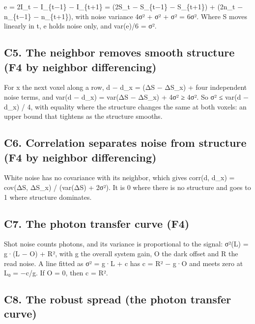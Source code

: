 e = 2I\_\allowbreak{}t − I\_\allowbreak{}\{t−1\} − I\_\allowbreak{}\{t+1\} = (2S\_\allowbreak{}t − S\_\allowbreak{}\{t−1\} − S\_\allowbreak{}\{t+1\}) + (2n\_\allowbreak{}t − n\_\allowbreak{}\{t−1\} − n\_\allowbreak{}\{t+1\}), with noise variance 4σ² + σ² + σ² = 6σ². Where S moves linearly in t, e holds noise only, and var(e)/6 = σ².

\subsection{\texorpdfstring{C5. The neighbor removes smooth structure (F4 by neighbor differencing)}{C5. The neighbor removes smooth structure (F4 by neighbor differencing)}}

For x the next voxel along a row, d − d\_\allowbreak{}x = (ΔS − ΔS\_\allowbreak{}x) + four independent noise terms, and var(d − d\_\allowbreak{}x) = var(ΔS − ΔS\_\allowbreak{}x) + 4σ² ≥ 4σ². So σ² ≤ var(d − d\_\allowbreak{}x) / 4, with equality where the structure changes the same at both voxels: an upper bound that tightens as the structure smooths.

\subsection{\texorpdfstring{C6. Correlation separates noise from structure (F4 by neighbor differencing)}{C6. Correlation separates noise from structure (F4 by neighbor differencing)}}

White noise has no covariance with its neighbor, which gives corr(d, d\_\allowbreak{}x) = cov(ΔS, ΔS\_\allowbreak{}x) / (var(ΔS) + 2σ²). It is 0 where there is no structure and goes to 1 where structure dominates.

\subsection{\texorpdfstring{C7. The photon transfer curve (F4)}{C7. The photon transfer curve (F4)}}

Shot noise counts photons, and its variance is proportional to the signal: σ²(L) = g·(L − O) + R², with g the overall system gain, O the dark offset and R the read noise. A line fitted as σ² = g·L + c has c = R² − g·O and meets zero at L₀ = −c/g. If O = 0, then c = R².

\subsection{\texorpdfstring{C8. The robust spread (the photon transfer curve)}{C8. The robust spread (the photon transfer curve)}}

